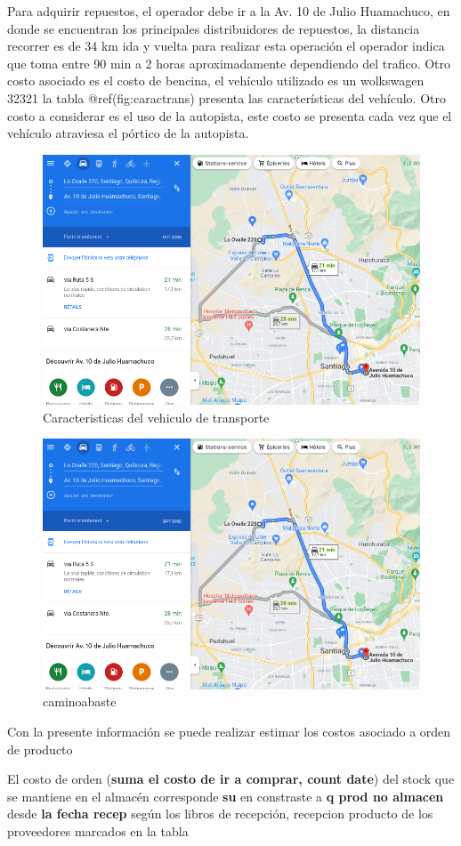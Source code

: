 \documentclass[
]{article}
\begin{document}
Para adquirir repuestos, el operador debe ir a la Av. 10 de Julio
Huamachuco, en donde se encuentran los principales distribuidores de
repuestos, la distancia recorrer es de 34 km ida y vuelta para realizar
esta operación el operador indica que toma entre 90 min a 2 horas
aproximadamente dependiendo del trafico. Otro costo asociado es el costo
de bencina, el vehículo utilizado es un wolkswagen 32321 la tabla
@ref(fig:caractrans) presenta las características del vehículo. Otro
costo a considerar es el uso de la autopista, este costo se presenta
cada vez que el vehículo atraviesa el pórtico de la autopista.

\begin{figure}[H]

{\centering \includegraphics[width=0.2\linewidth]{marco teorico/image/caminoabaste} 

}

\caption{Caracteristicas del vehiculo de transporte}\label{fig:unnamed-chunk-12}
\end{figure}

\begin{figure}
\centering
\includegraphics{fig/caminoabaste.png}
\caption{caminoabaste}
\end{figure}

Con la presente información se puede realizar estimar los costos
asociado a orden de producto

El costo de orden (\textbf{suma el costo de ir a comprar, count date})
del stock que se mantiene en el almacén corresponde \textbf{su} en
constraste a \textbf{q prod no almacen} desde \textbf{la fecha recep}
según los libros de recepción, recepcion producto de los proveedores
marcados en la tabla
\end{document}
